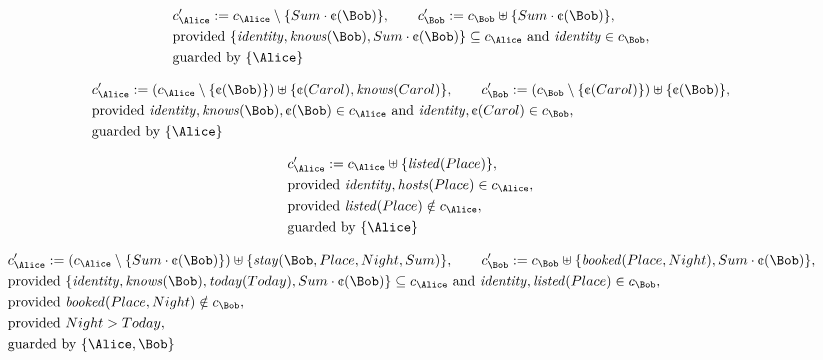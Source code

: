 \begin{align*}
&
c'_
{
\Alice
}
 := 
c_
{
\Alice
}
 \setminus 
\{
Sum
\cdot
\text{\textcent}
(
\Bob
)
\}
, \qquad 
c'_
{
\Bob
}
 := 
c_
{
\Bob
}
 \uplus 
\{
Sum
\cdot
\text{\textcent}
(
\Bob
)
\}
,\\
&
\text{provided } 
\{
\mathit{
identity
}
,
\mathit{
knows
}
(
\Bob
)
,
Sum
\cdot
\text{\textcent}
(
\Bob
)
\}
 \subseteq c_
{
\Alice
}
 \text{ and } 
\mathit{
identity
}
 \in c_
{
\Bob
}
,\\
&
\text{guarded by } \{
\Alice
\}
\end{align*}

\begin{align*}
&
c'_
{
\Alice
}
 := 
(c_
{
\Alice
}
 \setminus 
\{
\text{\textcent}
(
\Bob
)
\}
) \uplus 
\{
\text{\textcent}
(
Carol
)
,
\mathit{
knows
}
(
Carol
)
\}
, \qquad 
c'_
{
\Bob
}
 := 
(c_
{
\Bob
}
 \setminus 
\{
\text{\textcent}
(
Carol
)
\}
) \uplus 
\{
\text{\textcent}
(
\Bob
)
\}
,\\
&
\text{provided } 
\mathit{
identity
}
,
\mathit{
knows
}
(
\Bob
)
,
\text{\textcent}
(
\Bob
)
 \in c_
{
\Alice
}
 \text{ and } 
\mathit{
identity
}
,
\text{\textcent}
(
Carol
)
 \in c_
{
\Bob
}
,\\
&
\text{guarded by } \{
\Alice
\}
\end{align*}

\begin{align*}
&
c'_
{
\Alice
}
 := 
c_
{
\Alice
}
 \uplus 
\{
\mathit{
listed
}
(
Place
)
\}
,\\
&
\text{provided } 
\mathit{
identity
}
,
\mathit{
hosts
}
(
Place
)
 \in c_
{
\Alice
}
,\\
&
\text{provided } 
\mathit{
listed
}
(
Place
)
 \notin c_
{
\Alice
}
,\\
&
\text{guarded by } \{
\Alice
\}
\end{align*}

\begin{align*}
&
c'_
{
\Alice
}
 := 
(c_
{
\Alice
}
 \setminus 
\{
Sum
\cdot
\text{\textcent}
(
\Bob
)
\}
) \uplus 
\{
\mathit{
stay
}
(
\Bob
,
Place
,
Night
,
Sum
)
\}
, \qquad 
c'_
{
\Bob
}
 := 
c_
{
\Bob
}
 \uplus 
\{
\mathit{
booked
}
(
Place
,
Night
)
,
Sum
\cdot
\text{\textcent}
(
\Bob
)
\}
,\\
&
\text{provided } 
\{
\mathit{
identity
}
,
\mathit{
knows
}
(
\Bob
)
,
\mathit{
today
}
(
Today
)
,
Sum
\cdot
\text{\textcent}
(
\Bob
)
\}
 \subseteq c_
{
\Alice
}
 \text{ and } 
\mathit{
identity
}
,
\mathit{
listed
}
(
Place
)
 \in c_
{
\Bob
}
,\\
&
\text{provided } 
\mathit{
booked
}
(
Place
,
Night
)
 \notin c_
{
\Bob
}
,\\
&
\text{provided } 
Night
>
Today
,\\
&
\text{guarded by } \{
\Alice
,
\Bob
\}
\end{align*}
